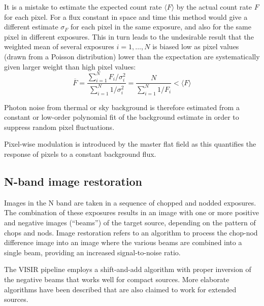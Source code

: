 It is a mistake to estimate the expected count rate $\langle F\rangle$
by the actual count rate $F$ for each pixel. For a flux constant in
space and time this method would give a different estimate
$\sigma_{F}$ for each pixel in the same exposure, and also for the same pixel
in different exposures. This in turn leads to the undesirable result
that the weighted mean of several exposures $i = 1,\dots, N$ is biased
low as pixel values (drawn from a Poisson distribution) lower than the
expectation are systematically given larger weight than high pixel
values:
\begin{equation}
  \label{eq:weighted_mean}
  \overline{F} = \frac{\sum_{i=1}^{N}
    F_{i}/\sigma_{i}^{2}}{\sum_{i=1}^{N} 1/\sigma_{i}^{2}} =
  \frac{N}{\sum_{i=1}^{N}1/F_{i}} < \langle F\rangle
\end{equation}

Photon noise from thermal or sky background is therefore estimated
from a constant or low-order polynomial fit of the background estimate
in order to suppress random pixel fluctuations.

Pixel-wise modulation is introduced by the master flat field as this
quantifies the response of pixels to a constant background flux.

\subsection{N-band image restoration}
\label{ssec:criticalnbandimagerestoration}
\label{ssec:image_restoration}


Images in the N band are taken in a sequence of chopped and nodded
exposures. The combination of these exposures results in an image with
one or more positive and negative images (``beams'') of the target
source, depending on the pattern of chops and nods. Image restoration
refers to an algorithm to process the chop-nod difference image into
an image where the various beams are combined into a single beam,
providing an increased signal-to-noise ratio.

The VISIR pipeline employs a shift-and-add algorithm with proper
inversion of the negative beams that works well for compact sources.
More elaborate algorithms have been
described that are also claimed to work for extended sources.

